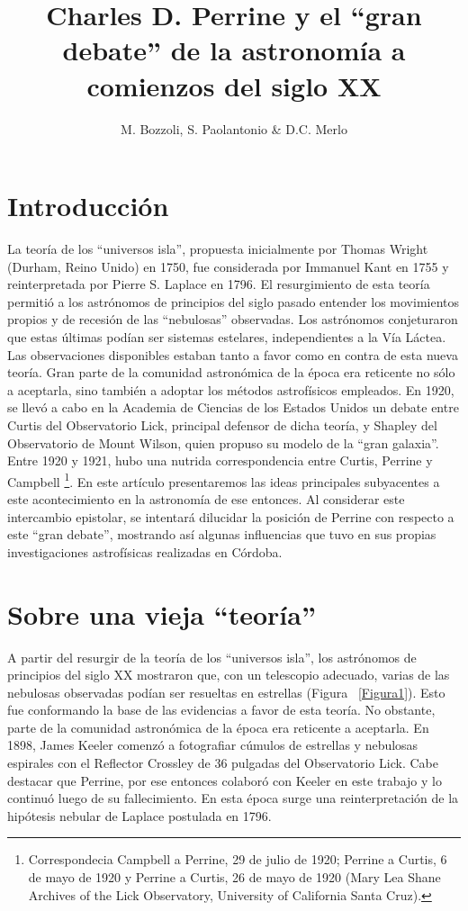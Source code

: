 \documentclass[baaa]{baaa}
\title{Charles D. Perrine y el “gran debate” de la astronomía a comienzos del siglo XX}
\author{
M. Bozzoli\inst{1,2,3},
S. Paolantonio\inst{1} \&
D.C. Merlo\inst{1}
}
\institute{
Museo del Observatorio Astronómico de Córdoba, UNC, Argentina
\and
Facultad de Filosofía y Humanidades, UNC, Argentina
\and
Consejo Nacional de Investigaciones Científicas y Técnicas, Argentina
}
\begin{document}
\maketitle
\section{Introducción}\label{S_intro}

La teoría de los “universos isla”, propuesta inicialmente por Thomas Wright (Durham, Reino Unido) en 1750, fue considerada por Immanuel Kant en 1755 y reinterpretada por Pierre S. Laplace en 1796. El resurgimiento de esta teoría permitió a los astrónomos de principios del siglo pasado entender los movimientos propios y de recesión de las “nebulosas” observadas. Los astrónomos conjeturaron que estas últimas podían ser sistemas estelares, independientes a la Vía Láctea. Las observaciones disponibles estaban tanto a favor como en contra de esta nueva teoría. Gran parte de la comunidad astronómica de la época era reticente no sólo a aceptarla, sino también a adoptar los métodos astrofísicos empleados. En 1920, se llevó a cabo en la Academia de Ciencias de los Estados Unidos un debate entre Curtis del Observatorio Lick, principal defensor de dicha teoría, y Shapley del Observatorio de Mount Wilson, quien propuso su modelo de la “gran galaxia”. Entre 1920 y 1921, hubo una nutrida correspondencia entre Curtis, Perrine y Campbell \footnote{Correspondecia Campbell a Perrine, 29 de julio de 1920; Perrine a Curtis, 6 de mayo de 1920 y Perrine a Curtis, 26 de mayo de 1920 (Mary Lea Shane Archives of the Lick Observatory, University of California Santa Cruz).}. En este artículo presentaremos las ideas principales subyacentes a este acontecimiento en la astronomía de ese entonces. Al considerar este intercambio epistolar, se intentará dilucidar la posición de Perrine con respecto a este “gran debate”, mostrando así algunas influencias que tuvo en sus propias investigaciones astrofísicas realizadas en Córdoba.


\section{Sobre una vieja “teoría”}

A partir del resurgir de la teoría de los “universos isla”, los astrónomos de principios del siglo XX mostraron que, con un telescopio adecuado, varias de las nebulosas observadas podían ser resueltas en estrellas (Figura ~\ref{Figura1}). Esto fue conformando la base de las evidencias a favor de esta teoría. No obstante, parte de la comunidad astronómica de la época era reticente a aceptarla. En 1898, James Keeler comenzó a fotografiar cúmulos de estrellas y nebulosas espirales con el Reflector Crossley de 36 pulgadas del Observatorio Lick. Cabe destacar que Perrine, por ese entonces colaboró con Keeler en este trabajo y lo continuó luego de su fallecimiento. En esta época surge una reinterpretación de la hipótesis nebular de Laplace postulada en 1796.
\end{document}
